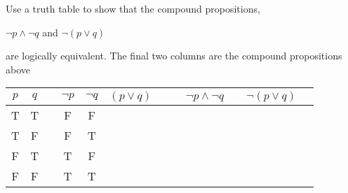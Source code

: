     \begin{questionNOGRADE}{\thequestion}
        Use a truth table to show that the compound propositions,

        \begin{center}
        $ \neg p \land \neg q $
        \tab and \tab
        $ \neg ( p \lor q ) $
        \end{center}
        are logically equivalent. The final two columns are
        the compound propositions above
        ~\\
        \begin{center}
            \begin{tabular}{ | c | c | c | c | c | c  c | c | c | c | c | c | }
                \hline
                $p$ &
                $q$ & &

                $\neg p$ &
                $\neg q$ &

                $(p \lor q)$ & & &

                $ \neg p \land \neg q $ & &
                $ \neg ( p \lor q ) $
                \\ \hline

                T & T & & F & F & & & & & & \\ \hline
                T & F & & F & T & & & & & & \\ \hline
                F & T & & T & F & & & & & & \\ \hline
                F & F & & T & T & & & & & & \\ \hline
            \end{tabular} 
        \end{center}       
    \end{questionNOGRADE}



